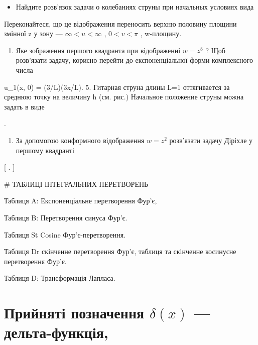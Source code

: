 \documentclass[
  ukrainian,
]{article}
\providecommand{\tightlist}{%
  \setlength{\itemsep}{0pt}\setlength{\parskip}{0pt}}
\begin{document}
\begin{itemize}
\tightlist
\item
  Найдите розв'язок задачи о колебаниях струны при начальных условиях
  вида
\end{itemize}

Переконайтеся, що це відображення переносить верхню половину площини
змінної z у зону --- \(\infty < u < \infty\) , \(0 < v < \pi\) ,
w-площину.

\begin{enumerate}
\def\labelenumi{\arabic{enumi}.}
\setcounter{enumi}{1}
\tightlist
\item
  Яке зображення першого квадранта при відображенні \(w=z^{8}\) ? Щоб
  розв'язати задачу, корисно перейти до експоненціальної форми
  комплексного числа
\end{enumerate}

u\_1(x, 0) = (3\pi \alpha/L)\sin(3\pi x/L). 5. Гитарная струна длины L=1
оттягивается за среднюю точку на величину h (см. рис.) Начальное
положение струны можна задать в виде

.

\begin{enumerate}
\def\labelenumi{\arabic{enumi}.}
\setcounter{enumi}{2}
\tightlist
\item
  За допомогою конформного відображення \(w=z^2\) розв'язати задачу
  Діріхле у першому квадранті
\end{enumerate}

{[} \right. {]}

\# ТАБЛИЦІ ІНТЕГРАЛЬНИХ ПЕРЕТВОРЕНЬ

Таблиця A: Експоненціальне перетворення Фур'є,

Таблиця B: Перетворення синуса Фур'є.

Таблиця St Cosine Фур'є-перетворення.

Таблиця Dr скінченне перетворення Фур'є, таблиця та скінченне косинусне
перетворення Фур'є.

Таблиця D: Трансформація Лапласа.

\section{\texorpdfstring{Прийняті позначення \(\delta\left(x\right)\)
---
дельта-функція,}{Прийняті позначення \textbackslash delta\textbackslash left(x\textbackslash right) --- дельта-функція,}}\label{ux43fux440ux438ux439ux43dux44fux442ux456-ux43fux43eux437ux43dux430ux447ux435ux43dux43dux44f-deltaleftxright-ux434ux435ux43bux44cux442ux430-ux444ux443ux43dux43aux446ux456ux44f-1}
\end{document}
